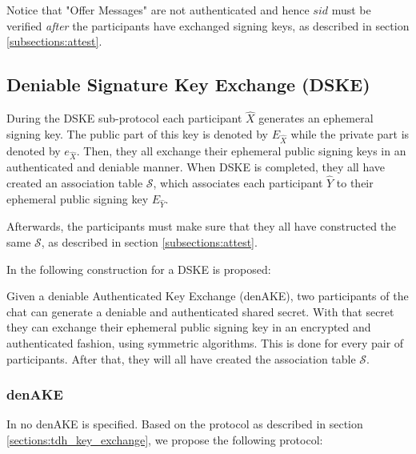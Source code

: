Notice that "Offer Messages" are not authenticated and hence $sid$ must be verified \emph{after} the participants have exchanged signing keys, as described in section \ref{subsections:attest}.


\subsection{Deniable Signature Key Exchange (DSKE)}
\label{subsections:DSKE}
During the DSKE sub-protocol each participant $\hat{X}$ generates an ephemeral signing key. The public part of this key is denoted by $E_{\hat{X}}$ while the private part is denoted by $e_{\hat{X}}$. Then, they all exchange their ephemeral public signing keys in an authenticated and deniable manner. When DSKE is completed, they all have created an association table $\mathcal{S}$, which associates each participant $\hat{Y}$ to their ephemeral public signing key $E_{\hat{Y}}$.

Afterwards, the participants must make sure that they all have constructed the same $\mathcal{S}$, as described in section \ref{subsections:attest}.

In \cite{mpotr} the following construction for a DSKE is proposed:

Given a deniable Authenticated Key Exchange (denAKE), two participants of the chat can generate a deniable and authenticated shared secret. With that secret they can exchange their ephemeral public signing key in an encrypted and authenticated fashion, using symmetric algorithms. This is done for every pair of participants. After that, they will all have created the association table $\mathcal{S}$.


\subsubsection{denAKE}
In \cite{mpotr} no denAKE is specified. Based on the \tdhname protocol as described in section \ref{sections:tdh_key_exchange}, we propose the following protocol:

